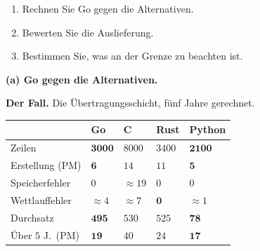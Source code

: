 \begin{merksatz}
\begin{technik}
\begin{center}
\begin{minipage}{0.86\textwidth}
\end{minipage}
\end{center}
\end{technik}
\end{merksatz}

\begin{aufgabe}
\begin{enumerate}[label=(\alph*)]
\item Rechnen Sie Go gegen die Alternativen.
\item Bewerten Sie die Auslieferung.
\item Bestimmen Sie, was an der Grenze zu beachten ist.
\end{enumerate}

\loesung
\textbf{(a) Go gegen die Alternativen.}

\textbf{Der Fall.} Die Übertragungsschicht, fünf Jahre gerechnet.

\begin{center}
{\small
\renewcommand{\arraystretch}{1.45}
\begin{tabular}{@{}P{2.6cm}P{1.6cm}P{1.6cm}P{1.6cm}P{1.6cm}@{}}
\toprule
& \textbf{Go} & \textbf{C} & \textbf{Rust} & \textbf{Python}\\
\midrule
Zeilen & $\mathbf{3000}$ & $8000$ & $3400$ & $\mathbf{2100}$\\
Erstellung (PM) & $\mathbf{6}$ & $14$ & $11$ & $\mathbf{5}$\\
Speicherfehler & \textcolor{gruen}{$0$} & \textcolor{akzent}{$\approx19$} & \textcolor{gruen}{$0$} & \textcolor{gruen}{$0$}\\
Wettlauffehler & \textcolor{mittel}{$\approx4$} & \textcolor{akzent}{$\approx7$} & \textcolor{gruen}{$\mathbf{0}$} & \textcolor{gruen}{$\approx1$}\\
Durchsatz & $\mathbf{495}$ & $530$ & $525$ & \textcolor{akzent}{$\mathbf{78}$}\\
Über $5$ J.\ (PM) & $\mathbf{19}$ & $40$ & $24$ & $\mathbf{17}$\\
\bottomrule
\end{tabular}}
\end{center}

\begin{center}
\begin{minipage}{0.88\textwidth}
\end{minipage}
\end{center}


\end{aufgabe}
